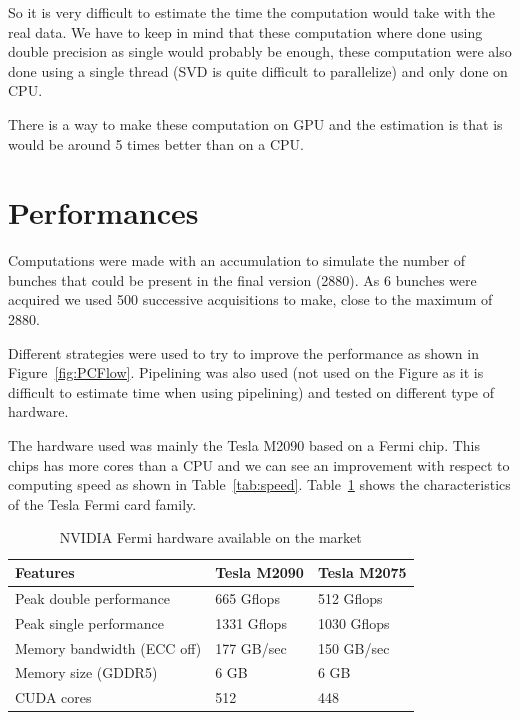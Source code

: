 So it is very difficult to estimate the time the computation would take with the real data. We have to keep in mind that these computation where done using double precision as single would probably be enough, these computation were also done using a single thread (SVD is quite difficult to parallelize) and only done on \gls{CPU}.

There is a way to make these computation on \gls{GPU}\cite{Lahabar09} and the estimation is that is would be around 5 times better than on a \gls{CPU}.

\section{Performances}
\label{sec:perf}

Computations were made with an accumulation to simulate the number of bunches that could be present in the final version (2880). As 6 bunches were acquired we used 500 successive acquisitions to make, close to the maximum of 2880.

Different strategies were used to try to improve the performance as shown in Figure~\ref{fig:PCFlow}. Pipelining was also used (not used on the Figure as it is difficult to estimate time when using pipelining) and tested on different type of hardware.

The hardware used was mainly the Tesla M2090 based on a Fermi chip. This chips has more cores than a CPU and we can see an improvement with respect to computing speed as shown in Table~\ref{tab:speed}. Table~\ref{tab:fermi} shows the characteristics of the Tesla Fermi card family.

\begin{table}[H]
\caption{NVIDIA Fermi hardware available on the market}
\label{tab:fermi}
\centering
\begin{tabular}{|l|l|l|}
\hline
Features & Tesla M2090 & Tesla M2075 \\
\hline
\hline
Peak double performance & 665 Gflops  & 512 Gflops \\
\hline
Peak single performance & 1331 Gflops & 1030 Gflops \\
\hline
Memory bandwidth (ECC off) & 177 GB/sec & 150 GB/sec \\
\hline
Memory size (GDDR5) & 6 GB & 6 GB \\
\hline
CUDA cores & 512 & 448 \\
\hline
\end{tabular}
\end{table}

